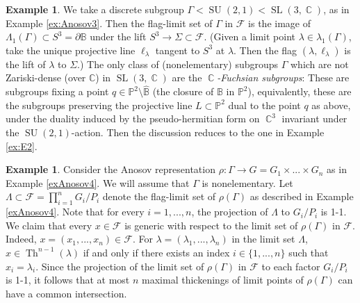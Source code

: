 \documentclass[12pt]{amsbook}%
\theoremstyle{definition}
\newtheorem{example}[thm]{Example}
\theoremstyle{remark}
\numberwithin{section}{chapter}
\numberwithin{subsection}{section}
\numberwithin{figure}{chapter}
\DeclareMathOperator{\C}{\mathbb{C}}
\DeclareMathOperator{\SL}{SL}
\DeclareMathOperator{\SU}{SU}
\DeclareMathOperator{\Th}{Th}
\def\bC{{\mathbb{C}}}
\def\P{{\mathbb{P}}}
\def\cF{{\mathscr{F}}}
\def\Ga{\Gamma}
\def\La{\Lambda}
\def\la{\lambda}
\begin{document}
{{ \begin{example}\label{ex:E3}
 We take a discrete subgroup $\Gamma< \SU(2,1)< \SL(3,\C)$, as in Example \ref{ex:Anosov3}. Then the flag-limit set of $\Ga$ in $\cF$ is the image of $\La_1(\Ga)\subset S^3=\partial \mathbb B$ under the lift $S^3\to \Sigma\subset \cF$. (Given a limit point $\la\in \la_1(\Ga)$, take the unique projective line $\ell_\la$ tangent to $S^3$ at $\la$. Then the flag $(\la,\ell_\la)$ is the lift of $\la$ to $\Sigma$.)  The only class of (nonelementary) subgroups $\Ga$ which are not Zariski-dense (over $\bC$) in $\SL(3,\C)$ are the {\em $\C$-Fuchsian subgroups}: These are subgroups fixing a point $q\in \P^2 \setminus 
 \hat{\mathbb B}$ (the closure of $\mathbb B$ in $\P^2$), equivalently, these are the subgroups preserving the projective line $L\subset \P^2$ dual to the point $q$ as above, under the duality induced by the pseudo-hermitian form on $\C^3$ invariant under the $\SU(2,1)$-action. Then the discussion reduces to the one 
 in Example \ref{ex:E2}. 
 \end{example}






\begin{example}
Consider the Anosov representation $\rho: \Ga\to G= G_1\times ...\times G_n$ as in Example \ref{exAnosov4}. We will assume that $\Ga$ 
is nonelementary. Let $\La\subset \cF= \prod_{i=1}^n G_i/P_i$ denote the flag-limit set of $\rho(\Ga)$ as described in Example \ref{exAnosov4}. 
Note that for every $i=1,...,n$, the projection of $\La$ to $G_i/P_i$ is 1-1. 
We claim that every $x\in \cF$ is generic with respect to the limit set of $\rho(\Gamma)$ in $\cF$. 
Indeed, $x=(x_1,...,x_n)\in \cF$. For $\lambda=(\lambda_1,...,\lambda_n)$ in the limit set $\La$, $x\in \Th^{n-1}(\lambda)$ 
if and only if there exists an index $i\in \{1,...,n\}$ such that $x_i= \lambda_i$. Since the projection of the limit set of $\rho(\Ga)$ in 
$\cF$ to each factor $G_i/P_i$ is 1-1, it follows that at most $n$ maximal thickenings of limit points of $\rho(\Gamma)$ can have a 
common intersection.   


\end{example}}}
\end{document}
